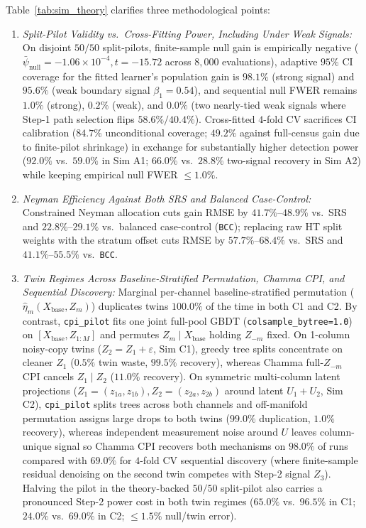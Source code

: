 \documentclass[11pt]{article}
\theoremstyle{remark}
\begin{document}
Table~\ref{tab:sim_theory} clarifies three methodological points:
\begin{enumerate}
  \item \emph{Split-Pilot Validity vs.\ Cross-Fitting Power, Including Under Weak Signals:} On disjoint $50/50$ split-pilots, finite-sample null gain is empirically negative ($\bar{\psi}_{\text{null}} = -1.06 \times 10^{-4}, t = -15.72$ across $8{,}000$ evaluations), adaptive $95\%$ CI coverage for the fitted learner's population gain is $98.1\%$ (strong signal) and $95.6\%$ (weak boundary signal $\beta_1 = 0.54$), and sequential null FWER remains $1.0\%$ (strong), $0.2\%$ (weak), and $0.0\%$ (two nearly-tied weak signals where Step-1 path selection flips $58.6\%/40.4\%$). Cross-fitted $4$-fold CV sacrifices CI calibration ($84.7\%$ unconditional coverage; $49.2\%$ against full-census gain due to finite-pilot shrinkage) in exchange for substantially higher detection power ($92.0\%$ vs.\ $59.0\%$ in Sim A1; $66.0\%$ vs.\ $28.8\%$ two-signal recovery in Sim A2) while keeping empirical null FWER $\le 1.0\%$.
  \item \emph{Neyman Efficiency Against Both SRS and Balanced Case-Control:} Constrained Neyman allocation cuts gain RMSE by $41.7\%\text{--}48.9\%$ vs.\ SRS and $22.8\%\text{--}29.1\%$ vs.\ balanced case-control (\texttt{BCC}); replacing raw HT split weights with the \citet{breslow1988logistic} stratum offset cuts RMSE by $57.7\%\text{--}68.4\%$ vs.\ SRS and $41.1\%\text{--}55.5\%$ vs.\ \texttt{BCC}.
  \item \emph{Twin Regimes Across Baseline-Stratified Permutation, Chamma CPI, and Sequential Discovery:} Marginal per-channel baseline-stratified permutation ($\hat{\eta}_m(X_{\text{base}}, Z_m)$) duplicates twins $100.0\%$ of the time in both C1 and C2. By contrast, \texttt{cpi\_pilot} fits one joint full-pool GBDT (\texttt{colsample\_bytree=1.0}) on $[X_{\text{base}}, Z_{1:M}]$ and permutes $Z_m \mid X_{\text{base}}$ holding $Z_{-m}$ fixed. On 1-column noisy-copy twins ($Z_2 = Z_1 + \varepsilon$, Sim C1), greedy tree splits concentrate on cleaner $Z_1$ ($0.5\%$ twin waste, $99.5\%$ recovery), whereas Chamma full-$Z_{-m}$ CPI cancels $Z_1 \mid Z_2$ ($11.0\%$ recovery). On symmetric multi-column latent projections ($Z_1 = (z_{1a}, z_{1b}), Z_2 = (z_{2a}, z_{2b})$ around latent $U_1 + U_2$, Sim C2), \texttt{cpi\_pilot} splits trees across both channels and off-manifold permutation \citep{hooker2021unrestricted} assigns large drops to both twins ($99.0\%$ duplication, $1.0\%$ recovery), whereas independent measurement noise around $U$ leaves column-unique signal so Chamma CPI recovers both mechanisms on $98.0\%$ of runs compared with $69.0\%$ for $4$-fold CV sequential discovery (where finite-sample residual denoising on the second twin competes with Step-2 signal $Z_3$). Halving the pilot in the theory-backed $50/50$ split-pilot also carries a pronounced Step-2 power cost in both twin regimes ($65.0\%$ vs.\ $96.5\%$ in C1; $24.0\%$ vs.\ $69.0\%$ in C2; $\le 1.5\%$ null/twin error).
\end{enumerate}
\end{document}
